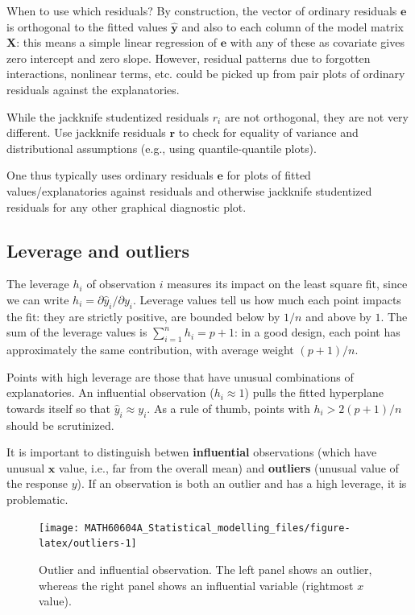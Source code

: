 \documentclass[
  11pt,
  letterpaper,
]{book}
\theoremstyle{definition}
\theoremstyle{definition}
\theoremstyle{definition}
\theoremstyle{definition}
\theoremstyle{remark}
\begin{document}
When to use which residuals? By construction, the vector of ordinary residuals \(\boldsymbol{e}\) is orthogonal to the fitted values \(\widehat{\boldsymbol{y}}\) and also to each column of the model matrix \(\mathbf{X}\): this means a simple linear regression of \(\boldsymbol{e}\) with any of these as covariate gives zero intercept and zero slope. However, residual patterns due to forgotten interactions, nonlinear terms, etc. could be picked up from pair plots of ordinary residuals against the explanatories.

While the jackknife studentized residuals \(r_i\) are not orthogonal, they are not very different. Use jackknife residuals \(\boldsymbol{r}\) to check for equality of variance and distributional assumptions (e.g., using quantile-quantile plots).

One thus typically uses ordinary residuals \(\boldsymbol{e}\) for plots of fitted values/explanatories against residuals and otherwise jackknife studentized residuals for any other graphical diagnostic plot.

\hypertarget{leverage-and-outliers}{%
\subsection{Leverage and outliers}\label{leverage-and-outliers}}

The leverage \(h_i\) of observation \(i\) measures its impact on the least square fit, since we can write \(h_i = \partial \widehat{y}_i/\partial y_i\). Leverage values tell us how much each point impacts the fit: they are strictly positive, are bounded below by \(1/n\) and above by \(1\). The sum of the leverage values is \(\sum_{i=1}^n h_i=p+1\): in a good design, each point has approximately the same contribution, with average weight \((p+1)/n\).

Points with high leverage are those that have unusual combinations of explanatories. An influential observation (\(h_i\approx 1\)) pulls the fitted hyperplane towards itself so that \(\hat{y}_i \approx y_i\). As a rule of thumb, points with \(h_i> 2(p+1)/n\) should be scrutinized.

It is important to distinguish betwen \textbf{influential} observations (which have unusual \(\mathbf{x}\) value, i.e., far from the overall mean) and \textbf{outliers} (unusual value of the response \(y\)).
If an observation is both an outlier and has a high leverage, it is problematic.

\begin{figure}

{\centering \texttt{[image: MATH60604A\_Statistical\_modelling\_files/figure-latex/outliers-1]} 

}

\caption{Outlier and influential observation. The left panel shows an outlier, whereas the right panel shows an influential variable (rightmost $x$ value).}\label{fig:outliers}
\end{figure}
\end{document}
